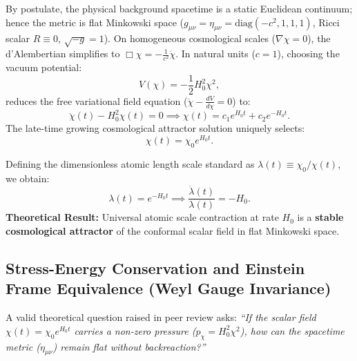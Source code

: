 \documentclass[11pt,a4paper]{article}
\begin{document}
By postulate, the physical background spacetime is a static Euclidean continuum; hence the metric is flat Minkowski space ($g_{\mu\nu} = \eta_{\mu\nu} = \text{diag}(-c^2, 1, 1, 1)$, Ricci scalar $R \equiv 0$, $\sqrt{-g}=1$). On homogeneous cosmological scales ($\nabla \chi = 0$), the d'Alembertian simplifies to $\Box \chi = -\frac{1}{c^2}\ddot{\chi}$. In natural units ($c=1$), choosing the vacuum potential:
\begin{equation}
    V(\chi) = -\frac{1}{2} H_0^2 \chi^2,
    \label{eq:potential_choice}
\end{equation}
reduces the free variational field equation ($\ddot{\chi} - \frac{dV}{d\chi} = 0$) to:
\begin{equation}
    \ddot{\chi}(t) - H_0^2 \chi(t) = 0 \implies \chi(t) = c_1 e^{H_0 t} + c_2 e^{-H_0 t}.
    \label{eq:chi_solution}
\end{equation}
The late-time growing cosmological attractor solution uniquely selects:
\begin{equation}
    \chi(t) = \chi_0 e^{H_0 t}.
\end{equation}

Defining the dimensionless atomic length scale standard as $\lambda(t) \equiv \chi_0 / \chi(t)$, we obtain:
\begin{equation}
    \lambda(t) = e^{-H_0 t} \implies \frac{\dot{\lambda}(t)}{\lambda(t)} = -H_0.
    \label{eq:hubble_baryon_en}
\end{equation}
\textbf{Theoretical Result:} Universal atomic scale contraction at rate $H_0$ is a \textbf{stable cosmological attractor} of the conformal scalar field in flat Minkowski space.

\subsection{Stress-Energy Conservation and Einstein Frame Equivalence (Weyl Gauge Invariance)}
\label{sec:weyl_denkligi_en}

A valid theoretical question raised in peer review asks: \textit{``If the scalar field $\chi(t) = \chi_0 e^{H_0 t}$ carries a non-zero pressure ($p_\chi = H_0^2 \chi^2$), how can the spacetime metric ($\eta_{\mu\nu}$) remain flat without backreaction?''}
\end{document}
